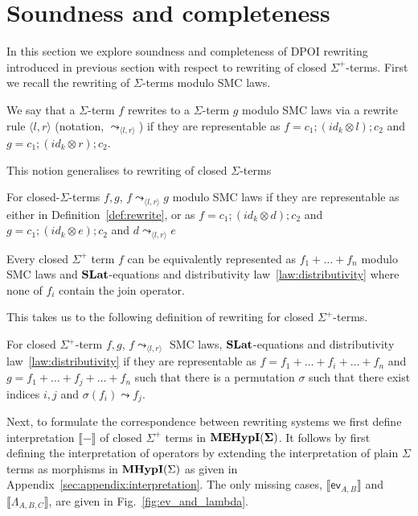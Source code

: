 \section{Soundness and completeness}

In this section we explore soundness and completeness of DPOI rewriting introduced in previous section with respect to rewriting of closed $\Sigma^{+}$-terms.
First we recall the rewriting of $\Sigma$-terms modulo SMC laws.

\begin{definition}
	\label{def:rewrite}
	We say that a $\Sigma$-term $f$ rewrites to a $\Sigma$-term $g$ modulo SMC laws via a rewrite rule $\langle l, r \rangle$ (notation, $\leadsto_{\langle l, r \rangle}$) if they are representable as
	$
		f = c_{1};(id_{k} \otimes l);c_{2} $ and $ g = c_{1};(id_{k} \otimes r);c_{2}
	$.
\end{definition}
This notion generalises to rewriting of closed $\Sigma$-terms
\begin{definition}
	For closed-$\Sigma$-terms $f,g$, $f \leadsto_{\langle l, r \rangle} g$ modulo SMC laws if they are representable as either in Definition~\ref{def:rewrite}, or as
	$
		f = c_{1};(id_{k} \otimes d);c_{2} $ and $ g = c_{1};(id_{k} \otimes e);c_{2}
	$
	and $d \leadsto_{\langle l, r \rangle} e$
\end{definition}
\begin{lemma}
	\label{lemma:normal_form}
	Every closed $\Sigma^{+}$ term $f$ can be equivalently represented as
	$
		f_{1} + \ldots + f_{n}
	$ modulo SMC laws and $\mathbf{SLat}$-equations and distributivity law~\ref{law:distributivity} where none of $f_{i}$ contain the join operator.
\end{lemma}
This takes us to the following definition of rewriting for closed $\Sigma^{+}$-terms.
\begin{definition}
	For closed $\Sigma^{+}$-term $f,g$, $f \leadsto_{\langle l, r \rangle}$ SMC laws, $\mathbf{SLat}$-equations and distributivity law~\ref{law:distributivity} if they are representable as
	$
		f = f_{1} + \ldots + f_{i} + \ldots + f_{n} $ and $ g = f_{1} + \ldots + f_{j} + \ldots + f_{n}
	$
	such that there is a permutation $\sigma$ such that there exist indices $i,j$ and $\sigma(f_{i}) \leadsto f_{j}$.
\end{definition}
Next, to formulate the correspondence between rewriting systems we first define interpretation $\llbracket - \rrbracket$ of closed $\Sigma^{+}$ terms in ${\mathbf{MEHypI(\Sigma)}}$.
It follows by first defining the interpretation of operators by extending the interpretation of plain $\Sigma$ terms as morphisms in $\textbf{MHypI}(\Sigma)$ as given in Appendix~\ref{sec:appendix:interpretation}.
The only missing cases, $\llbracket \textsf{ev}_{A,B} \rrbracket$ and $\llbracket \Lambda_{A,B,C} \rrbracket$, are given in Fig.~\ref{fig:ev_and_lambda}.

